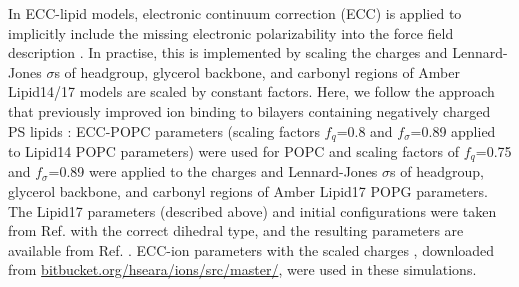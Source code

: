 \documentclass[journal=jpcbfk]{achemso}
\begin{document}
In ECC-lipid models, electronic continuum correction (ECC) is applied to 
implicitly include the missing electronic polarizability into the force field description \cite{melcr18,melcr19}.
In practise, this is implemented by scaling the charges and Lennard-Jones $\sigma$s of headgroup, glycerol backbone, and carbonyl regions
of Amber Lipid14/17 models are scaled by constant factors.
Here, we follow the approach that previously improved ion binding to bilayers containing negatively charged PS lipids \cite{melcr19}:
ECC-POPC parameters (scaling factors $f_q$=0.8 and $f_\sigma$=0.89 applied to Lipid14 POPC parameters) \cite{melcr18} were used for POPC
and scaling factors of $f_q$=0.75 and $f_\sigma$=0.89 were applied to the charges and Lennard-Jones $\sigma$s of headgroup, glycerol backbone, and carbonyl regions
of Amber Lipid17 POPG parameters. The Lipid17 parameters (described above) and initial configurations
were taken from Ref. \cite{POPGlipid17} with the correct dihedral type,
and the resulting parameters are available from Ref. . ECC-ion parameters with the scaled charges \cite{pluharova14,kohagen16,martinek18},
downloaded from \url{bitbucket.org/hseara/ions/src/master/}, were used in these simulations. 





\clearpage

\end{document}
